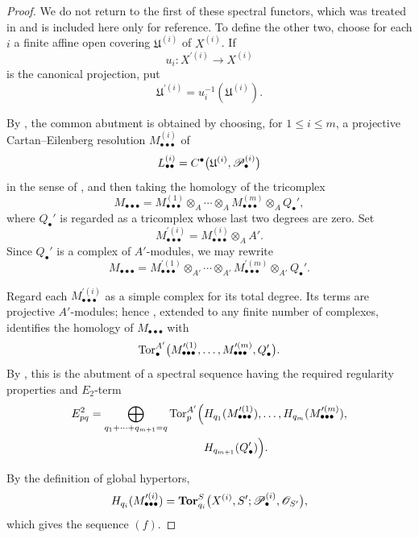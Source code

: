 \begin{proof}
We do not return to the first of these spectral functors, which was
treated in  and is included here only for reference.
To define the other two, choose for each $i$ a finite affine open
covering $\mathfrak U^{(i)}$ of $X^{(i)}$.  If
\[
  u_i:X^{\prime(i)}\longrightarrow X^{(i)}
\]
is the canonical projection, put
\[
  \mathfrak U^{\prime(i)}
  =
  u_i^{-1}(\mathfrak U^{(i)}).
\]

By , the common abutment is obtained by choosing,
for $1\leq i\leq m$, a projective Cartan--Eilenberg resolution
$M_{\bullet\bullet\bullet}^{(i)}$ of
\[
  L_{\bullet\bullet}^{(i)}
  =
  C^\bullet
  \bigl(
    \mathfrak U^{(i)},\mathscr{P}_\bullet^{(i)}
  \bigr)
\]
in the sense of , and then taking the homology of
the tricomplex
\[
  M_{\bullet\bullet\bullet}
  =
  M_{\bullet\bullet\bullet}^{(1)}
  \otimes_A\cdots\otimes_A
  M_{\bullet\bullet\bullet}^{(m)}
  \otimes_A Q_\bullet',
\]
where $Q_\bullet'$ is regarded as a tricomplex whose last two
degrees are zero.  Set
\[
  M_{\bullet\bullet\bullet}^{\prime(i)}
  =
  M_{\bullet\bullet\bullet}^{(i)}\otimes_AA'.
\]
Since $Q_\bullet'$ is a complex of $A'$-modules, we may rewrite
\[
  M_{\bullet\bullet\bullet}
  =
  M_{\bullet\bullet\bullet}^{\prime(1)}
  \otimes_{A'}\cdots\otimes_{A'}
  M_{\bullet\bullet\bullet}^{\prime(m)}
  \otimes_{A'}Q_\bullet'.
\]

Regard each $M_{\bullet\bullet\bullet}^{\prime(i)}$ as a simple
complex for its total degree.  Its terms are projective
$A'$-modules; hence , extended to any finite number
of complexes, identifies the homology of
$M_{\bullet\bullet\bullet}$ with
\[
  \operatorname{Tor}_\bullet^{A'}
  \bigl(
    M_{\bullet\bullet\bullet}^{\prime(1)},\ldots,
    M_{\bullet\bullet\bullet}^{\prime(m)},Q_\bullet'
  \bigr).
\]
By , this is the abutment of a spectral sequence
having the required regularity properties and $E_2$-term
\[
\begin{split}
  E_{pq}^2
  =
  \bigoplus_{q_1+\cdots+q_{m+1}=q}
  \operatorname{Tor}_p^{A'}
  \Bigl(
    &
    H_{q_1}(M_{\bullet\bullet\bullet}^{\prime(1)}),\ldots,
    H_{q_m}(M_{\bullet\bullet\bullet}^{\prime(m)}),
    \\
    &
    H_{q_{m+1}}(Q_\bullet')
  \Bigr).
\end{split}
\]

By the definition of global hypertors,
\[
  H_{q_i}(M_{\bullet\bullet\bullet}^{\prime(i)})
  =
  \mathbf{Tor}_{q_i}^S
  \bigl(
    X^{(i)},S';
    \mathscr{P}_\bullet^{(i)},\mathscr{O}_{S'}
  \bigr),
\]
which gives the sequence $(f)$.


\end{proof}
